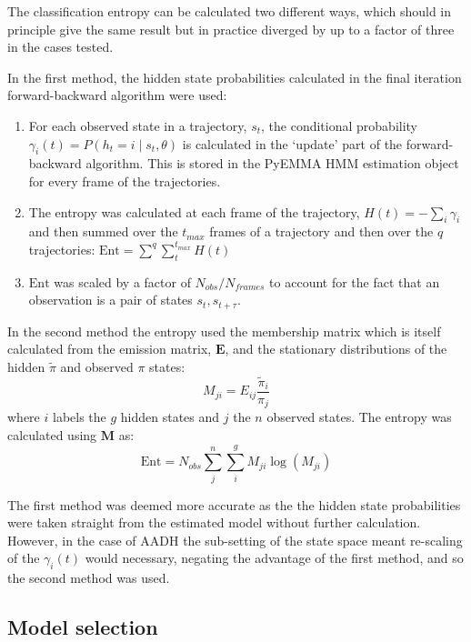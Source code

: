The classification entropy can be calculated two different ways, which should in principle give the same result but in practice diverged by up to a factor of three in the cases tested. 

In the first method, the hidden state probabilities calculated in the final iteration forward-backward algorithm were used: 
\begin{enumerate}
    \item For each observed state in a trajectory, $s_t$, the conditional probability $\gamma_{i}(t)=P\left(h_{t}=i \mid s_t, \theta\right)$ is calculated in the `update' part of the forward-backward algorithm. This is stored in the PyEMMA HMM estimation object for every frame of the trajectories. 
    \item The entropy was calculated at each frame of the trajectory,  $H(t)=-\sum_{i}\gamma_{i}$ and then summed over the $t_{max}$ frames of a trajectory and then over the $q$ trajectories: $\mathrm{Ent} = \sum^{q} \sum_{t}^{t_{max}} H(t)$
    \item $\mathrm{Ent}$ was scaled by a factor of $N_{obs}/N_{frames}$ to account for the fact that an observation is a pair of states $s_{t}, s_{t+\tau}$.
\end{enumerate}

In the second method the entropy used the membership matrix which is itself calculated from the emission matrix, $\mathbf{E}$, and the stationary distributions of the hidden $\tilde{\pi}$ and observed $\pi$ states: 
\begin{equation}
    M_{ji} = E_{ij}\frac{\tilde{\pi}_{i}}{\pi_{j}}
\end{equation}
where $i$ labels the $g$ hidden states and $j$ the $n$ observed states. The entropy was calculated using $\mathbf{M}$ as: 
\begin{equation}
    \mathrm{Ent} = N_{obs}\sum^{n}_{j}\sum^{g}_{i} M_{ji}\log{\left(M_{ji}\right)}
\end{equation}

The first method was deemed more accurate as the the hidden state probabilities were taken straight from the estimated model without further calculation. However, in the case of AADH the sub-setting of the state space meant re-scaling of the $\gamma_{i}(t)$ would necessary, negating the advantage of the first method, and so the second method was used. 

\subsection{Model selection}

